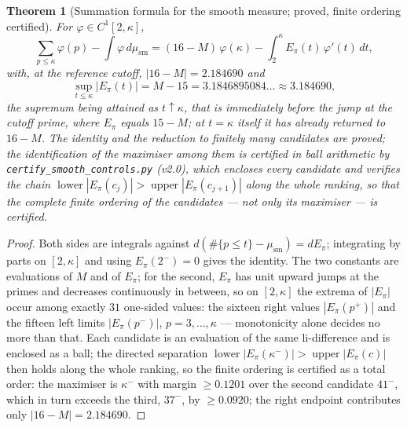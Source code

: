 \documentclass[11pt]{article}
\newtheorem{theorem}{Theorem}[section]
\begin{document}
\begin{theorem}[Summation formula for the smooth measure; proved, finite
ordering certified]
\label{thm:inv}
For $\varphi\in C^1[2,\kappa]$,
\[
\sum_{p\le\kappa}\varphi(p)-\int\varphi\,d\mu_{\mathrm{sm}}
=(16-M)\,\varphi(\kappa)-\int_2^{\kappa}E_\pi(t)\,\varphi'(t)\,dt ,
\]
with, at the reference cutoff, $|16-M|=2.184690$ and
\[
\sup_{t\le\kappa}|E_\pi(t)|=M-15=3.1846895084\ldots\approx3.184690,
\]
the supremum being attained as $t\uparrow\kappa$, that is immediately
\emph{before} the jump at the cutoff prime, where $E_\pi$ equals $15-M$; at
$t=\kappa$ itself it has already returned to $16-M$. The identity and the
reduction to finitely many candidates are proved; the identification of the
maximiser among them is certified in ball arithmetic by
\texttt{certify\_smooth\_controls.py} (v2.0), which encloses every candidate
and verifies the chain $\operatorname{lower}|E_\pi(c_j)|
>\operatorname{upper}|E_\pi(c_{j+1})|$ along the whole ranking, so that the
complete finite ordering of the candidates --- not only its maximiser --- is
certified.
\end{theorem}

\begin{proof}
Both sides are integrals against $d(\#\{p\le t\}-\mu_{\mathrm{sm}})=dE_\pi$;
integrating by parts on $[2,\kappa]$ and using $E_\pi(2^-)=0$ gives the
identity. The two constants are evaluations of $M$ and of $E_\pi$; for the second,
$E_\pi$ has unit upward jumps at the primes and decreases continuously in
between, so on $[2,\kappa]$ the extrema of $|E_\pi|$ occur among exactly
$31$ one-sided values: the sixteen right values $|E_\pi(p^+)|$ and the fifteen
left limits $|E_\pi(p^-)|$, $p=3,\dots,\kappa$ --- monotonicity alone decides
no more than that. Each candidate is an evaluation of the same
$\mathrm{li}$-difference and is enclosed as a ball; the directed separation
$\operatorname{lower}|E_\pi(\kappa^-)|>\operatorname{upper}|E_\pi(c)|$ then
holds along the whole ranking, so the finite ordering is certified as a total
order: the maximiser is $\kappa^-$ with margin $\ge0.1201$ over the second
candidate $41^-$, which in turn exceeds the third, $37^-$, by $\ge0.0920$; the
right endpoint contributes only $|16-M|=2.184690$.
\end{proof}
\end{document}
